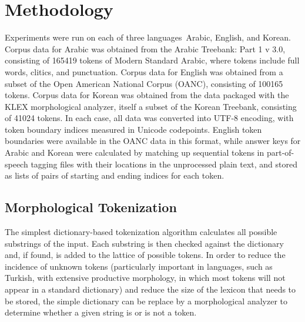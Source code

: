 \chapter{Methodology}

Experiments were run on each of three languages\textemdash~Arabic, English, and Korean. Corpus data for Arabic was obtained from the Arabic Treebank: Part 1 v 3.0\cite{maamouri05}, consisting of 165419 tokens of Modern Standard Arabic, where tokens include full words, clitics, and punctuation. Corpus data for English was obtained from a subset of the Open American National Corpus (OANC)\cite{oanc}, consisting of 100165 tokens. Corpus data for Korean was obtained from the data packaged with the KLEX morphological analyzer\cite{han04}, itself a subset of the Korean Treebank, consisting of 41024 tokens. In each case, all data was converted into UTF-8 encoding, with token boundary indices measured in Unicode codepoints. English token boundaries were available in the OANC data in this format, while answer keys for Arabic and Korean were calculated by matching up sequential tokens in part-of-speech tagging files with their locations in the unprocessed plain text, and stored as lists of pairs of starting and ending indices for each token.

\section{Morphological Tokenization}
The simplest dictionary-based tokenization algorithm calculates all possible substrings of the input. Each substring is then checked against the dictionary and, if found, is added to the lattice of possible tokens. In order to reduce the incidence of unknown tokens (particularly important in languages, such as Turkish, with extensive productive morphology, in which most tokens will not appear in a standard dictionary) and reduce the size of the lexicon that needs to be stored, the simple dictionary can be replace by a morphological analyzer to determine whether a given string is or is not a token.

